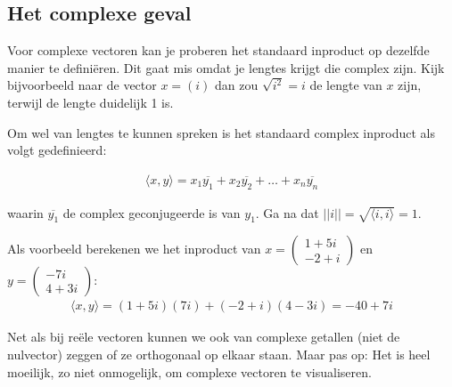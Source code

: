\documentclass[../main.tex]{subfiles}
\begin{document}
\subsection*{Het complexe geval}
Voor complexe vectoren kan je proberen het standaard inproduct op dezelfde manier te definiëren. Dit gaat mis omdat je lengtes krijgt die complex zijn. Kijk bijvoorbeeld naar de vector $x= (i)$ dan zou $\sqrt{i^2}=i$ de lengte van $x$ zijn, terwijl de lengte duidelijk 1 is.

Om wel van lengtes te kunnen spreken is het standaard complex inproduct als volgt gedefinieerd:

\[\begin{aligned}\langle x,y\rangle=x_1\overline{y_1}+x_2\overline{y_2}+\ldots+x_n\overline{y_n}\end{aligned}\]

waarin $\overline{y_1}$ de complex geconjugeerde is van $y_1$. Ga na dat  $||i||=\sqrt{\langle i,i\rangle}=1$.

Als voorbeeld berekenen we het inproduct van $x=\begin{pmatrix}1+5i\\-2+i\end{pmatrix}$ en $y=\begin{pmatrix}-7i\\4+3i\end{pmatrix}$:
\[\begin{aligned}\langle x,y\rangle=(1+5i)(7i)+(-2+i)(4-3i)=-40+7i\end{aligned}\]

Net als bij reële vectoren kunnen we ook van complexe getallen (niet de nulvector) zeggen of ze orthogonaal op elkaar staan. Maar pas op: Het is heel moeilijk, zo niet onmogelijk, om complexe vectoren te visualiseren. 
\end{document}
